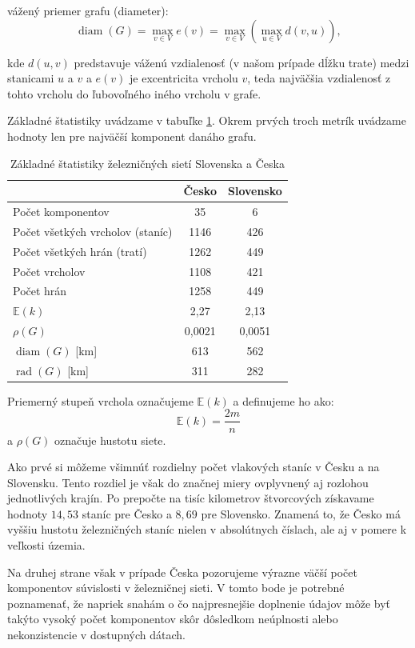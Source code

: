 \documentclass[main.tex]{subfiles}
\begin{document}
vážený priemer grafu (diameter):
\[
\operatorname{diam}(G) = \max_{v \in V} e(v) = \max_{v \in V} \left( \max_{u \in V} d(v, u) \right),
\]

kde \( d(u, v) \) predstavuje váženú vzdialenosť (v našom prípade dĺžku trate) medzi stanicami \( u \) a \( v \) a \( e(v) \) je excentricita vrcholu \( v \), teda najväčšia vzdialenosť z tohto vrcholu do ľubovoľného iného vrcholu v grafe.

Základné štatistiky uvádzame v tabuľke \ref{tab:statistics}. Okrem prvých troch metrík uvádzame hodnoty len pre najväčší komponent danáho grafu.

\begin{table}[h!]
\label{tab:statistics}
\centering
\caption{Základné štatistiky železničných sietí Slovenska a Česka}
\begin{tabular}{@{}lcc@{}}
\toprule
 & Česko & Slovensko \\
\midrule
Počet komponentov & 35 & 6 \\
Počet všetkých vrcholov (staníc) & 1146 & 426 \\
Počet všetkých hrán (tratí) & 1262 & 449 \\
Počet vrcholov & 1108 & 421 \\
Počet hrán & 1258 & 449 \\
$\mathbb{E}(k)$ & 2{,}27 & 2{,}13 \\
$\rho(G)$ & 0{,}0021 & 0{,}0051 \\
$\operatorname{diam}(G)$ [km] & 613 & 562 \\
$\operatorname{rad}(G)$ [km] & 311 & 282 \\
\bottomrule
\end{tabular}
\end{table}
Priemerný stupeň vrchola označujeme $\mathbb{E}(k)$ a definujeme ho ako:
\begin{equation*}
    \mathbb{E}(k) = \frac{2m}{n}
\end{equation*}
a $\rho(G)$ označuje hustotu siete.

Ako prvé si môžeme všimnúť rozdielny počet vlakových staníc v Česku a na Slovensku. Tento rozdiel je však do značnej miery ovplyvnený aj rozlohou jednotlivých krajín. Po prepočte na tisíc kilometrov štvorcových získavame hodnoty $14{,}53$ staníc pre Česko a $8{,}69$ pre Slovensko. Znamená to, že Česko má vyššiu hustotu železničných staníc nielen v absolútnych číslach, ale aj v pomere k veľkosti územia.

Na druhej strane však v prípade Česka pozorujeme výrazne väčší počet komponentov súvislosti v železničnej sieti. V tomto bode je potrebné poznamenať, že napriek snahám o čo najpresnejšie doplnenie údajov môže byť takýto vysoký počet komponentov skôr dôsledkom neúplnosti alebo nekonzistencie v dostupných dátach.
\end{document}
